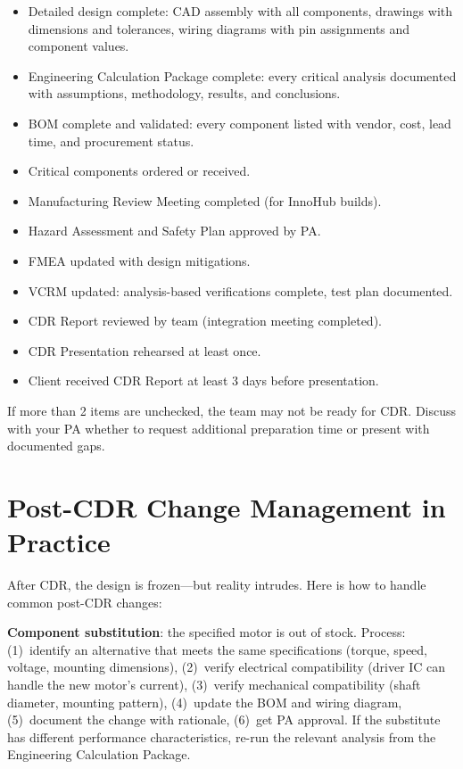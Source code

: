 \begin{itemize}[nosep,leftmargin=1.5em]
\item[$\square$] Detailed design complete: CAD assembly with all components, drawings with dimensions and tolerances, wiring diagrams with pin assignments and component values.
\item[$\square$] Engineering Calculation Package complete: every critical analysis documented with assumptions, methodology, results, and conclusions.
\item[$\square$] BOM complete and validated: every component listed with vendor, cost, lead time, and procurement status.
\item[$\square$] Critical components ordered or received.
\item[$\square$] Manufacturing Review Meeting completed (for InnoHub builds).
\item[$\square$] Hazard Assessment and Safety Plan approved by PA.
\item[$\square$] FMEA updated with design mitigations.
\item[$\square$] VCRM updated: analysis-based verifications complete, test plan documented.
\item[$\square$] CDR Report reviewed by team (integration meeting completed).
\item[$\square$] CDR Presentation rehearsed at least once.
\item[$\square$] Client received CDR Report at least 3 days before presentation.
\end{itemize}

If more than 2 items are unchecked, the team may not be ready for CDR. Discuss with your PA whether to request additional preparation time or present with documented gaps.



\section{Post-CDR Change Management in Practice}
After CDR, the design is frozen---but reality intrudes. Here is how to handle common post-CDR changes:

\textbf{Component substitution}: the specified motor is out of stock. Process: (1)~identify an alternative that meets the same specifications (torque, speed, voltage, mounting dimensions), (2)~verify electrical compatibility (driver IC can handle the new motor's current), (3)~verify mechanical compatibility (shaft diameter, mounting pattern), (4)~update the BOM and wiring diagram, (5)~document the change with rationale, (6)~get PA approval. If the substitute has different performance characteristics, re-run the relevant analysis from the Engineering Calculation Package.

